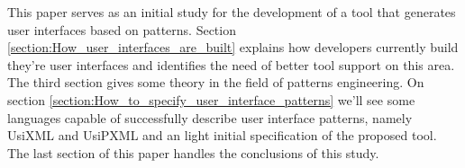 This paper serves as an initial study for the development of a tool that generates user interfaces based on patterns. Section \ref{section:How_user_interfaces_are_built} explains how developers currently build they're user interfaces and identifies the need of better tool support on this area. The third section gives some theory in the field of patterns engineering. On section \ref{section:How_to_specify_user_interface_patterns} we'll see some languages capable of successfully describe user interface patterns, namely UsiXML and UsiPXML and an light initial specification of the proposed tool. The last section of this paper handles the conclusions of this study.